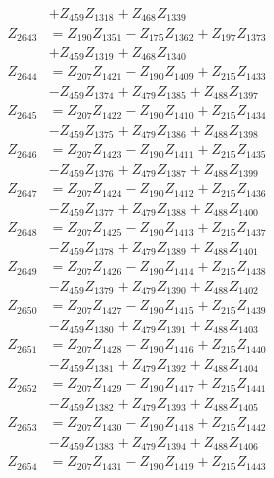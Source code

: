 \begin{multicols}{2}
\begin{align}
&+ Z_{459}Z_{1318} + Z_{468}Z_{1339} \nonumber \\
Z_{2643} &= Z_{190}Z_{1351} - Z_{175}Z_{1362} + Z_{197}Z_{1373}  \nonumber \\
&+ Z_{459}Z_{1319} + Z_{468}Z_{1340} \nonumber \\
Z_{2644} &= Z_{207}Z_{1421} - Z_{190}Z_{1409} + Z_{215}Z_{1433}  \nonumber \\
&- Z_{459}Z_{1374} + Z_{479}Z_{1385} + Z_{488}Z_{1397} \nonumber \\
Z_{2645} &= Z_{207}Z_{1422} - Z_{190}Z_{1410} + Z_{215}Z_{1434}  \nonumber \\
&- Z_{459}Z_{1375} + Z_{479}Z_{1386} + Z_{488}Z_{1398} \nonumber \\
Z_{2646} &= Z_{207}Z_{1423} - Z_{190}Z_{1411} + Z_{215}Z_{1435}  \nonumber \\
&- Z_{459}Z_{1376} + Z_{479}Z_{1387} + Z_{488}Z_{1399} \nonumber \\
Z_{2647} &= Z_{207}Z_{1424} - Z_{190}Z_{1412} + Z_{215}Z_{1436}  \nonumber \\
&- Z_{459}Z_{1377} + Z_{479}Z_{1388} + Z_{488}Z_{1400} \nonumber \\
Z_{2648} &= Z_{207}Z_{1425} - Z_{190}Z_{1413} + Z_{215}Z_{1437}  \nonumber \\
&- Z_{459}Z_{1378} + Z_{479}Z_{1389} + Z_{488}Z_{1401} \nonumber \\
Z_{2649} &= Z_{207}Z_{1426} - Z_{190}Z_{1414} + Z_{215}Z_{1438}  \nonumber \\
&- Z_{459}Z_{1379} + Z_{479}Z_{1390} + Z_{488}Z_{1402} \nonumber \\
Z_{2650} &= Z_{207}Z_{1427} - Z_{190}Z_{1415} + Z_{215}Z_{1439}  \nonumber \\
&- Z_{459}Z_{1380} + Z_{479}Z_{1391} + Z_{488}Z_{1403} \nonumber \\
Z_{2651} &= Z_{207}Z_{1428} - Z_{190}Z_{1416} + Z_{215}Z_{1440}  \nonumber \\
&- Z_{459}Z_{1381} + Z_{479}Z_{1392} + Z_{488}Z_{1404} \nonumber \\
Z_{2652} &= Z_{207}Z_{1429} - Z_{190}Z_{1417} + Z_{215}Z_{1441}  \nonumber \\
&- Z_{459}Z_{1382} + Z_{479}Z_{1393} + Z_{488}Z_{1405} \nonumber \\
Z_{2653} &= Z_{207}Z_{1430} - Z_{190}Z_{1418} + Z_{215}Z_{1442}  \nonumber \\
&- Z_{459}Z_{1383} + Z_{479}Z_{1394} + Z_{488}Z_{1406} \nonumber \\
Z_{2654} &= Z_{207}Z_{1431} - Z_{190}Z_{1419} + Z_{215}Z_{1443}  \nonumber \\

\end{align}
\end{multicols}
